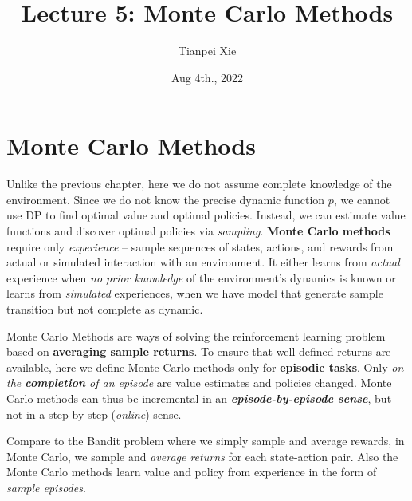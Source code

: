 \documentclass[11pt]{article}
\begin{document}
\title{Lecture 5: Monte Carlo Methods}
\author{Tianpei Xie}
\date{ Aug 4th., 2022 }
\maketitle
\tableofcontents
\newpage
\section{Monte Carlo Methods}
Unlike the previous chapter, here we do not assume complete knowledge of the environment. Since we do not know the precise dynamic function $p$, we cannot use DP to find optimal value and optimal policies. Instead, we can estimate  value functions and discover optimal policies via \emph{sampling}.  \textbf{Monte Carlo methods} require only \emph{experience} -- sample sequences of states, actions, and rewards from actual or simulated interaction with an environment. It either learns from \emph{actual} experience when \emph{no prior knowledge} of the environment’s dynamics is known or learns from \emph{simulated} experiences, when we have model that generate sample transition but not complete as dynamic. 

Monte Carlo Methods are ways of solving the reinforcement learning problem based on \textbf{averaging sample returns}. To ensure that well-defined returns are available, here we define Monte Carlo methods only for \textbf{episodic tasks}. Only \emph{on the \textbf{completion} of an episode} are value estimates and policies changed. Monte Carlo methods can thus be incremental in an \emph{\textbf{episode-by-episode sense}}, but not in a step-by-step (\emph{online}) sense.

Compare to the Bandit problem where we simply sample and average rewards, in Monte Carlo, we sample and \emph{average returns} for each state-action pair. Also the Monte Carlo methods learn value and policy from experience in the form of \emph{sample episodes}.
\end{document}
